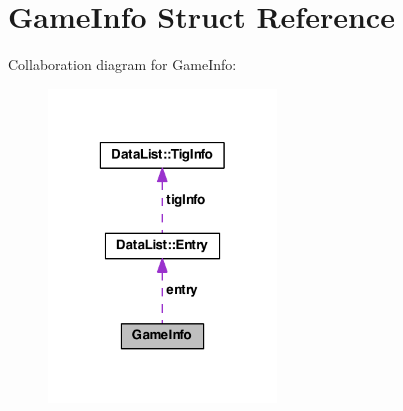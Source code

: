 \hypertarget{struct_game_info}{\section{Game\-Info Struct Reference}
\label{struct_game_info}
}


Collaboration diagram for Game\-Info\-:
\nopagebreak
\begin{figure}[H]
\begin{center}
\leavevmode
\includegraphics[width=172pt]{struct_game_info__coll__graph}
\end{center}
\end{figure}
